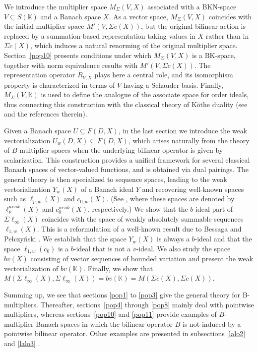 \documentclass[14pt, a4paper]{article}  %
\newcounter{property}
\providecommand{\pare}[1]{\left( #1\right) }
\newcommand{\K}{\mathbb{K}}
\newcommand{\BK}{\text{BK}}
\newcommand{\Mt}{M'}
\begin{document}
We introduce the multiplier space $M_{\Sigma}(V,X)$ associated with a BKN-space
$V \subseteq S(\K)$ and a Banach space $X$. As a vector space, $M_{\Sigma}(V,X)$
coincides with the  initial multiplier space $\Mt(V,\Sigma c(X))$, but the original bilinear action is replaced by a
summation-based representation  taking values in $X$ rather than in $\Sigma c(X)$,
which induces a natural renorming of the original multiplier space. Section~\ref{pop10} presents
conditions under which $M_{\Sigma}(V,X)$ is a $\BK$-space, together with norm
equivalence results with $\Mt(V,\Sigma c(X))$. The representation operator
$R_{V,X}$ plays here a central role, and its   isomorphism property is
characterized in terms of $V$ having a Schauder basis. 
Finally, $M_{\Sigma}(V,\K)$ is used to define the analogue of the associate space for order ideals, thus connecting this construction with the classical theory of Köthe duality (see \cite{CDS} and the references therein).
 

Given a Banach space $U \subseteq F(D,X)$, in the last section we introduce the weak vectorialization $U_{w}(D,X)\subseteq F\pare{D,X}$, which arises naturally from the theory of $B$-multiplier spaces when the underlying bilinear operator is given by scalarization. This construction
provides a unified framework for several classical Banach spaces of
vector-valued functions, and is obtained via dual pairings. The general
theory is then specialized to sequence spaces, leading to the weak
vectorialization $Y_{w}\pare{X}$ of a Banach ideal $Y$ and recovering well-known spaces such as
$\ell_{p,w}(X)$ and $c_{0,w}(X)$. (See \cite[p.~32]{DJT}, where these spaces are denoted by $\ell_{p}^{weak}(X)$ and $c_0^{weak}(X)$, respectively.) We show that the $b$-ideal part
of $\Sigma \ell_{\infty}(X)$ coincides   with the space of weakly
absolutely summable sequences $\ell_{1,w}(X)$. This is a reformulation of a well-known result due to  Bessaga and Pełczyński \cite[Lemma~2]{BP}. We establish that the space $Y_w(X)$ is always a $b$-ideal and that the space $\ell_{1,w} (c_0)$ is a $b$-ideal that is not a $v$-ideal.  We also study the space $bv\pare{X}$ consisting of vector sequences of bounded variation and present the weak vectorialization of $bv\pare{\K}$. Finally, we show that $M\pare{\Sigma \ell_{\infty}\pare{X},\Sigma \ell_{\infty}\pare{X}} = bv\pare{\K}=M\pare{\Sigma c\pare{X},\Sigma c\pare{X}}.$

Summing up, we see that sections \ref{pop1} to \ref{pop3} give the general theory for B-multipliers. Thereafter,  sections~\ref{pop4} through \ref{pop8} mainly deal with pointwise multipliers, whereas sections~\ref{pop10} and \ref{pop11} provide examples of $B$-multiplier Banach spaces in which the bilinear operator $B$ is not induced by a pointwise bilinear operator. Other examples are presented in subsections \ref{lalo2} and \ref{lalo3} .
\end{document}
